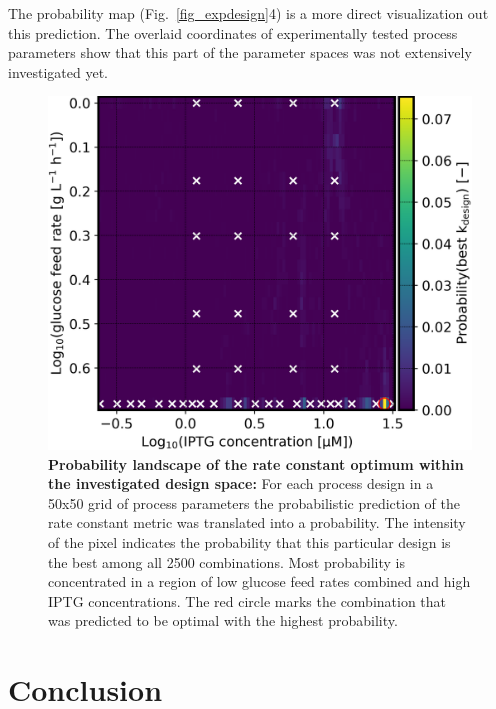 \documentclass[sn-standardnature]{sn-jnl}%
\theoremstyle{thmstyleone}%
\theoremstyle{thmstyletwo}%
\theoremstyle{thmstylethree}%
\begin{document}
The probability map (Fig.~\ref{fig_expdesign}4) is a more direct visualization out this prediction.
The overlaid coordinates of experimentally tested process parameters show that this part of the parameter spaces was not extensively investigated yet.

\begin{figure}[H]
    \centering
    \includegraphics[width=1.0\textwidth]{figures/p_best_k_design.png}
    \caption{
        \textbf{Probability landscape of the rate constant optimum within the investigated design space:}
        For each process design in a 50x50 grid of process parameters the probabilistic prediction of the rate constant metric was translated into a probability.
        The intensity of the pixel indicates the probability that this particular design is the best among all 2500 combinations.
        Most probability is concentrated in a region of low glucose feed rates combined and high IPTG concentrations.
        The red circle marks the combination that was predicted to be optimal with the highest probability.
    }
    \label{fig_kdesign_probs}
\end{figure}


\section{Conclusion}
\end{document}
